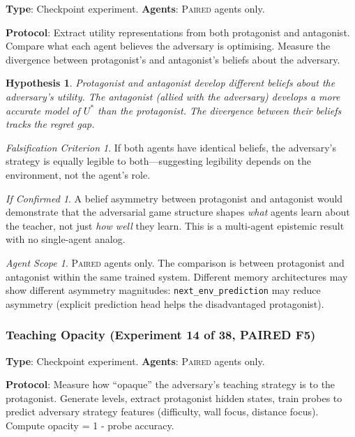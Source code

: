 \documentclass[11pt,a4paper]{article}
\newtheorem{hypothesis}{Hypothesis}[subsection]
\theoremstyle{remark}
\newtheorem*{falsification}{Falsification Criterion}
\newtheorem*{implication}{If Confirmed}
\newtheorem*{agentscope}{Agent Scope}
\newcommand{\paired}{\textsc{Paired}}
\newcommand{\Ustar}{U^*}
\begin{document}
\textbf{Type}: Checkpoint experiment. \textbf{Agents}: \paired{} agents only.

\textbf{Protocol}: Extract utility representations from both protagonist and antagonist. Compare what each agent believes the adversary is optimising. Measure the divergence between protagonist's and antagonist's beliefs about the adversary.

\begin{hypothesis}
Protagonist and antagonist develop different beliefs about the adversary's utility. The antagonist (allied with the adversary) develops a more accurate model of $\Ustar$ than the protagonist. The divergence between their beliefs tracks the regret gap.
\end{hypothesis}

\begin{falsification}
If both agents have identical beliefs, the adversary's strategy is equally legible to both---suggesting legibility depends on the environment, not the agent's role.
\end{falsification}

\begin{implication}
A belief asymmetry between protagonist and antagonist would demonstrate that the adversarial game structure shapes \textit{what} agents learn about the teacher, not just \textit{how well} they learn. This is a multi-agent epistemic result with no single-agent analog.
\end{implication}

\begin{agentscope}
\paired{} agents only. The comparison is between protagonist and antagonist within the same trained system. Different memory architectures may show different asymmetry magnitudes: \texttt{next\_env\_prediction} may reduce asymmetry (explicit prediction head helps the disadvantaged protagonist).
\end{agentscope}

\subsubsection{Teaching Opacity (Experiment 14 of 38, PAIRED F5)}
\label{exp:teaching_opacity}

\textbf{Type}: Checkpoint experiment. \textbf{Agents}: \paired{} agents only.

\textbf{Protocol}: Measure how ``opaque'' the adversary's teaching strategy is to the protagonist. Generate levels, extract protagonist hidden states, train probes to predict adversary strategy features (difficulty, wall focus, distance focus). Compute opacity = 1 - probe accuracy.
\end{document}
